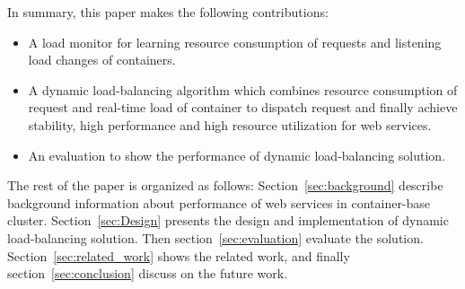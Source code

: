In summary, this paper makes the following contributions:

\begin{itemize}

\item A load monitor for learning resource consumption of requests and listening load changes of containers.

\item A dynamic load-balancing algorithm which combines resource consumption of request and real-time load of container to dispatch request and finally achieve stability, high performance and high resource utilization for web services.

\item An evaluation to show the performance of dynamic load-balancing solution.


\end{itemize}
The rest of the paper is organized as follows: Section~\ref{sec:background} describe background information about performance of web services in container-base cluster. Section~\ref{sec:Design} presents the design and implementation of dynamic load-balancing solution. Then section~\ref{sec:evaluation} evaluate the solution. Section~\ref{sec:related_work} shows the related work, and finally section~\ref{sec:conclusion} discuss on the future work.
